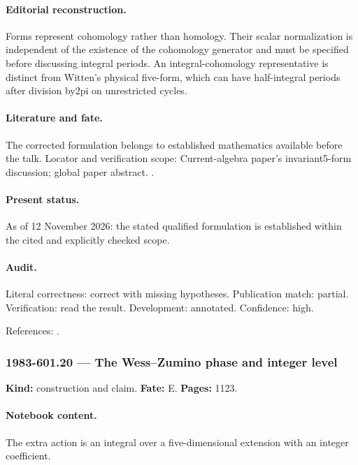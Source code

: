 \paragraph{Editorial reconstruction.} Forms represent cohomology rather than homology. Their scalar normalization is independent of the existence of the cohomology generator and must be specified before discussing integral periods. An integral-cohomology representative is distinct from Witten's physical five-form, which can have half-integral periods after division by2pi on unrestricted cycles.

\paragraph{Literature and fate.} The corrected formulation belongs to established mathematics available before the talk. Locator and verification scope: Current-algebra paper's invariant5-form discussion; global paper abstract. \cite{witten1983current,witten1983global}.

\paragraph{Present status.} As of 12 November 2026: the stated qualified formulation is established within the cited and explicitly checked scope.

\paragraph{Audit.} Literal correctness: correct with missing hypotheses. Publication match: partial. Verification: read the result. Development: annotated. Confidence: high.

\noindent References: \citep{witten1983current,witten1983global}.\par

\subsubsection{1983-601.20 --- The Wess--Zumino phase and integer level}

\label{item:1983-601.20}

\noindent\textbf{Kind:} construction and claim. \textbf{Fate:} E. \textbf{Pages:} 1123.\par

\paragraph{Notebook content.} The extra action is an integral over a five-dimensional extension with an integer coefficient.

